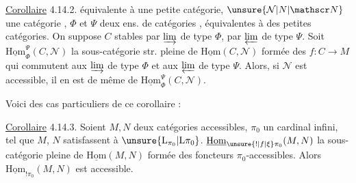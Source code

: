 \uline{Corollaire} 4.14.2.   équivalente à une petite catégorie, $\unsure{\mathcal N|N|\mathscr N}$ une catégorie , $\Phi$ et $\Psi$ deux  ens. de catégories , équivalentes à des petites catégories. On suppose  $C$  stables par $\varinjlim$ de type $\Phi$, par $\varprojlim$ de type $\Psi$. Soit $\underline{\mathrm{Hom}}_{\Phi}^{\Psi}(C,\mathcal N)$ la sous-catégorie str. pleine de $\underline{\mathrm{Hom}}(C,\mathcal N)$ formée des $f:C\longrightarrow M$ qui commutent aux $\varinjlim$ de type $\Phi$ et aux $\varprojlim$ de type $\Psi$. Alors, si $\mathcal N$ est accessible, il en est de même de $\underline{\mathrm{Hom}}_{\Phi}^{\Psi}(C,\mathcal N)$.

Voici des cas particuliers  de ce corollaire :

\uline{Corollaire} 4.14.3. Soient $M,N$ deux catégories accessibles,  $\pi_0$ un cardinal infini, tel que $M$,  $N$ satisfassent à $\unsure{\mathrm L_{\pi_0}|\mathrm L\pi_0}$.  $\underline{\mathrm{Hom}}_{\unsure{!|f|\xi}\pi_0}(M,N)$ la sous-catégorie  pleine de $\underline{\mathrm{Hom}}(M,N)$ formée des foncteurs $\pi_0$-accessibles. Alors $\underline{\mathrm{Hom}}_{!\pi_0}(M,N)$ est accessible.
